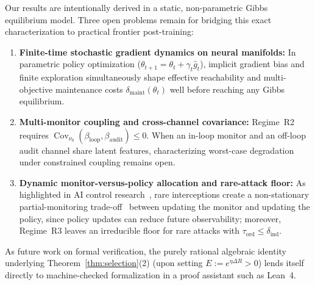 \documentclass[11pt,a4paper]{article}
\newcommand{\Cov}{\operatorname{Cov}}
\begin{document}
Our results are intentionally derived in a static, non-parametric Gibbs equilibrium model. Three open problems remain for bridging this exact characterization to practical frontier post-training:
\begin{enumerate}
  \item \textbf{Finite-time stochastic gradient dynamics on neural manifolds:} In parametric policy optimization ($\theta_{t+1} = \theta_t + \gamma_t \hat{g}_t$), implicit gradient bias and finite exploration simultaneously shape effective reachability and multi-objective maintenance costs $\delta_{\mathrm{maint}}(\theta_t)$ well before reaching any Gibbs equilibrium.
  \item \textbf{Multi-monitor coupling and cross-channel covariance:} Regime~R2 requires $\Cov_{\nu_0}(\beta_{\mathrm{loop}}, \beta_{\mathrm{audit}}) \le 0$. When an in-loop monitor and an off-loop audit channel share latent features, characterizing worst-case degradation under constrained coupling remains open.
  \item \textbf{Dynamic monitor-versus-policy allocation and rare-attack floor:} As highlighted in AI control research~\cite{ukaisi2025}, rare interceptions create a non-stationary partial-monitoring trade-off~\cite{bartok2014} between updating the monitor and updating the policy, since policy updates can reduce future observability; moreover, Regime~R3 leaves an irreducible floor for rare attacks with $\tau_{\mathrm{ord}} \le \delta_{\mathrm{ind}}$.
\end{enumerate}
As future work on formal verification, the purely rational algebraic identity underlying Theorem~\ref{thm:selection}(2) (upon setting $E := e^{\eta \Delta R} > 0$) lends itself directly to machine-checked formalization in a proof assistant such as Lean~4.
\end{document}
